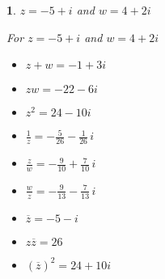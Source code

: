 \documentclass{amsbook}
\newtheorem{exc}{}
\newenvironment{ex}{\begin{exc}\normalfont}{\end{exc}}
\numberwithin{section}{chapter}
\numberwithin{equation}{chapter}
\begin{document}
\begin{ex}
	$z = -5+i$ and  $w = 4+2i$

	\begin{sol}
		For  $z = -5+i$ and  $w = 4+2i$
		
		\begin{multicols}{3}
			
			\begin{itemize}
				
				\item $z+w = -1+3i$
				
				\item $zw = -22-6i$
				
				\item $z^2 = 24-10i$
				
			\end{itemize}
			
		\end{multicols}
		
		\begin{multicols}{3}
			
			\begin{itemize}
				
				\item $\frac{1}{z} = -\frac{5}{26} - \frac{1}{26} \,i$
				
				\item $\frac{z}{w} = -\frac{9}{10} + \frac{7}{10} \, i$
				
				\item $\frac{w}{z} = -\frac{9}{13} - \frac{7}{13} \,i$
				
			\end{itemize}
			
		\end{multicols}
		
		\begin{multicols}{3}
			
			\begin{itemize}
				
				\item $\overline{z} = -5-i$
				
				\item $z\overline{z} = 26$
				
				\item $(\overline{z})^2 = 24+10i$
				
			\end{itemize}
			
		\end{multicols}
		
	\end{sol}
\end{ex}
\end{document}
